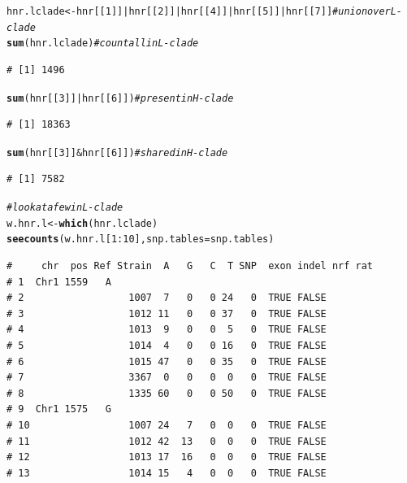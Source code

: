 \documentclass{article}\usepackage[]{graphicx}\usepackage[]{color}
\makeatletter
\newcommand{\hlnum}[1]{\textcolor[rgb]{0.686,0.059,0.569}{#1}}%
\newcommand{\hlcom}[1]{\textcolor[rgb]{0.678,0.584,0.686}{\textit{#1}}}%
\newcommand{\hlopt}[1]{\textcolor[rgb]{0,0,0}{#1}}%
\newcommand{\hlstd}[1]{\textcolor[rgb]{0.345,0.345,0.345}{#1}}%
\newcommand{\hlkwb}[1]{\textcolor[rgb]{0.69,0.353,0.396}{#1}}%
\newcommand{\hlkwc}[1]{\textcolor[rgb]{0.333,0.667,0.333}{#1}}%
\newcommand{\hlkwd}[1]{\textcolor[rgb]{0.737,0.353,0.396}{\textbf{#1}}}%
\newenvironment{kframe}{%
 \def\at@end@of@kframe{}%
 \ifinner\ifhmode%
  \def\at@end@of@kframe{\end{minipage}}%
  \begin{minipage}{\columnwidth}%
 \fi\fi%
 \def\FrameCommand##1{\hskip\@totalleftmargin \hskip-\fboxsep
 \colorbox{shadecolor}{##1}\hskip-\fboxsep
     \hskip-\linewidth \hskip-\@totalleftmargin \hskip\columnwidth}%
 \MakeFramed {\advance\hsize-\width
   \@totalleftmargin\z@ \linewidth\hsize
   \@setminipage}}%
 {\par\unskip\endMakeFramed%
 \at@end@of@kframe}
\newenvironment{knitrout}{}{} %
\makeatother
\begin{document}
\begin{knitrout}
\begin{kframe}
\begin{alltt}
\hlstd{hnr.lclade} \hlkwb{<-} \hlstd{hnr[[}\hlnum{1}\hlstd{]]} \hlopt{|} \hlstd{hnr[[}\hlnum{2}\hlstd{]]} \hlopt{|} \hlstd{hnr[[}\hlnum{4}\hlstd{]]} \hlopt{|} \hlstd{hnr[[}\hlnum{5}\hlstd{]]} \hlopt{|} \hlstd{hnr[[}\hlnum{7}\hlstd{]]}  \hlcom{# union over L-clade}
\hlkwd{sum}\hlstd{(hnr.lclade)}                                                     \hlcom{# count all in L-clade}
\end{alltt}
\begin{verbatim}
# [1] 1496
\end{verbatim}
\begin{alltt}
\hlkwd{sum}\hlstd{(hnr[[}\hlnum{3}\hlstd{]]} \hlopt{|} \hlstd{hnr[[}\hlnum{6}\hlstd{]])}                                            \hlcom{# present in H-clade}
\end{alltt}
\begin{verbatim}
# [1] 18363
\end{verbatim}
\begin{alltt}
\hlkwd{sum}\hlstd{(hnr[[}\hlnum{3}\hlstd{]]} \hlopt{&} \hlstd{hnr[[}\hlnum{6}\hlstd{]])}                                            \hlcom{# shared in H-clade}
\end{alltt}
\begin{verbatim}
# [1] 7582
\end{verbatim}
\begin{alltt}
\hlcom{# look at a few in L-clade}
\hlstd{w.hnr.l} \hlkwb{<-} \hlkwd{which}\hlstd{(hnr.lclade)}
\hlkwd{seecounts}\hlstd{(w.hnr.l[}\hlnum{1}\hlopt{:}\hlnum{10}\hlstd{],}\hlkwc{snp.tables}\hlstd{=snp.tables)}
\end{alltt}
\begin{verbatim}
#     chr  pos Ref Strain  A   G   C  T SNP  exon indel nrf rat
# 1  Chr1 1559   A                                             
# 2                  1007  7   0   0 24   0  TRUE FALSE        
# 3                  1012 11   0   0 37   0  TRUE FALSE        
# 4                  1013  9   0   0  5   0  TRUE FALSE        
# 5                  1014  4   0   0 16   0  TRUE FALSE        
# 6                  1015 47   0   0 35   0  TRUE FALSE        
# 7                  3367  0   0   0  0   0  TRUE FALSE        
# 8                  1335 60   0   0 50   0  TRUE FALSE        
# 9  Chr1 1575   G                                             
# 10                 1007 24   7   0  0   0  TRUE FALSE        
# 11                 1012 42  13   0  0   0  TRUE FALSE        
# 12                 1013 17  16   0  0   0  TRUE FALSE        
# 13                 1014 15   4   0  0   0  TRUE FALSE        

\end{verbatim}
\end{kframe}
\end{knitrout}
\end{document}
